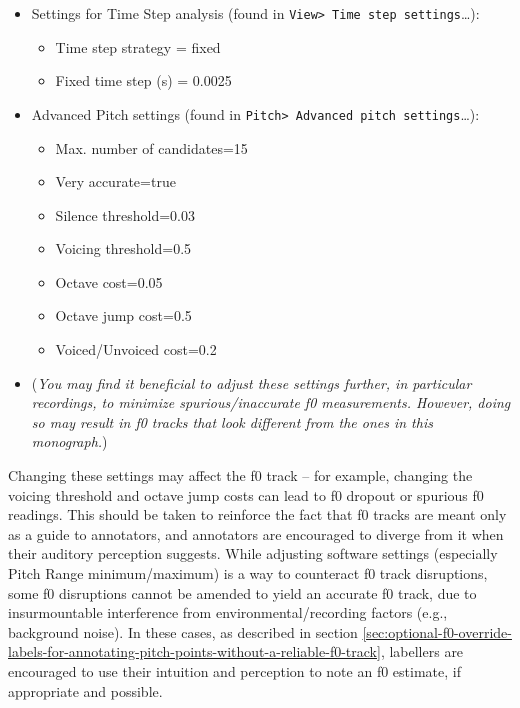 \documentclass[11pt, twoside]{memoir}
\begin{document}
\begin{itemize}
\item Settings for Time Step analysis (found in \texttt{View> Time step settings}\ldots):
	\begin{itemize}
		\item Time step strategy = fixed
		\item Fixed time step (s) = 0.0025
	\end{itemize} 
\item Advanced Pitch settings (found in \texttt{Pitch> Advanced pitch settings}\ldots):
	\begin{itemize}
		\item Max. number of candidates=15
		\item Very accurate=true
		\item Silence threshold=0.03
		\item Voicing threshold=0.5
		\item Octave cost=0.05
		\item Octave jump cost=0.5
		\item Voiced/Unvoiced cost=0.2
	\end{itemize}
\item[] (\textit{You may find it beneficial to adjust these settings further, in particular recordings, to minimize spurious\slash inaccurate f0 measurements. However, doing so may result in f0 tracks that look different from the ones in this monograph.})
\end{itemize}
Changing these settings may affect the f0 track – for example, changing the voicing threshold and octave jump costs can lead to f0 dropout or spurious f0 readings. This should be taken to reinforce the fact that f0 tracks are meant only as a guide to annotators, and annotators are encouraged to diverge from it when their auditory perception suggests. 
While adjusting software settings (especially Pitch Range minimum\slash maximum) is a way to counteract f0 track disruptions, some f0 disruptions cannot be amended to yield an accurate f0 track, due to insurmountable interference from environmental\slash recording factors (e.g., background noise). In these cases, as described in section \ref{sec:optional-f0-override-labels-for-annotating-pitch-points-without-a-reliable-f0-track}, labellers are encouraged to use their intuition and perception to note an f0 estimate, if appropriate and possible. 
\end{document}
